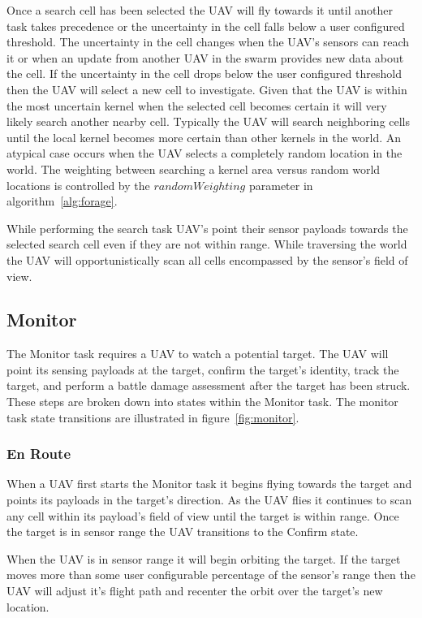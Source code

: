 
Once a search cell has been selected the UAV will fly towards it until another task takes precedence or the uncertainty in the cell falls below a user configured threshold.  The uncertainty in the cell changes when the UAV's sensors can reach it or when an update from another UAV in the swarm provides new data about the cell. If the uncertainty in the cell drops below the user configured threshold then the UAV will select a new cell to investigate.  Given that the UAV is within the most uncertain kernel when the selected cell becomes certain it will very likely search another nearby cell.  Typically the UAV will search neighboring cells until the local kernel becomes more certain than other kernels in the world.  An atypical case occurs when the UAV selects a completely random location in the world.  The weighting between searching a kernel area versus random world locations is controlled by the $randomWeighting$ parameter in algorithm~\ref{alg:forage}.

While performing the search task UAV's point their sensor payloads towards the selected search cell even if they are not within range.  While traversing the world the UAV will opportunistically scan all cells encompassed by the sensor's field of view.


\subsection{Monitor}
The Monitor task requires a UAV to watch a potential target.  The UAV will point its sensing payloads at the target, confirm the target's identity, track the target, and perform a battle damage assessment after the target has been struck.  These steps are broken down into states within the Monitor task.  The monitor task state transitions are illustrated in figure~\ref{fig:monitor}.

\subsubsection{En Route}
When a UAV first starts the Monitor task it begins flying towards the target and points its payloads in the target's direction.  As the UAV flies it continues to scan any cell within its payload's field of view until the target is within range.  Once the target is in sensor range the UAV transitions to the Confirm state.  

When the UAV is in sensor range it will begin orbiting the target.  If the target moves more than some user configurable percentage of the sensor's range then the UAV will adjust it's flight path and recenter the orbit over the target's new location.

